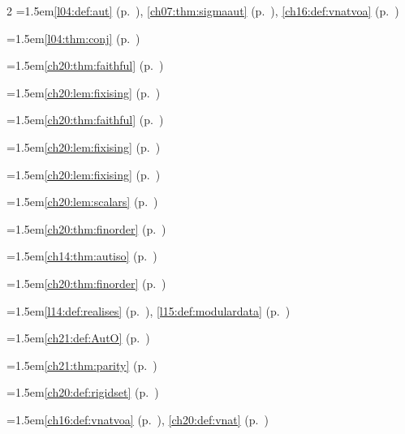 \begin{multicols}{2}
\hangindent=1.5em\quad \ref{l04:def:aut} (p.~\pageref{l04:def:aut}), \ref{ch07:thm:sigmaaut} (p.~\pageref{ch07:thm:sigmaaut}), \ref{ch16:def:vnatvoa} (p.~\pageref{ch16:def:vnatvoa})\par
\hangindent=1.5em\quad \ref{l04:thm:conj} (p.~\pageref{l04:thm:conj})\par
\hangindent=1.5em\quad \ref{ch20:thm:faithful} (p.~\pageref{ch20:thm:faithful})\par
\hangindent=1.5em\quad \ref{ch20:lem:fixising} (p.~\pageref{ch20:lem:fixising})\par
\hangindent=1.5em\quad \ref{ch20:thm:faithful} (p.~\pageref{ch20:thm:faithful})\par
\hangindent=1.5em\quad \ref{ch20:lem:fixising} (p.~\pageref{ch20:lem:fixising})\par
\hangindent=1.5em\quad \ref{ch20:lem:fixising} (p.~\pageref{ch20:lem:fixising})\par
\hangindent=1.5em\quad \ref{ch20:lem:scalars} (p.~\pageref{ch20:lem:scalars})\par
\hangindent=1.5em\quad \ref{ch20:thm:finorder} (p.~\pageref{ch20:thm:finorder})\par
\hangindent=1.5em\quad \ref{ch14:thm:autiso} (p.~\pageref{ch14:thm:autiso})\par
\hangindent=1.5em\quad \ref{ch20:thm:finorder} (p.~\pageref{ch20:thm:finorder})\par
\hangindent=1.5em\quad \ref{l14:def:realises} (p.~\pageref{l14:def:realises}), \ref{l15:def:modulardata} (p.~\pageref{l15:def:modulardata})\par
\hangindent=1.5em\quad \ref{ch21:def:AutO} (p.~\pageref{ch21:def:AutO})\par
\hangindent=1.5em\quad \ref{ch21:thm:parity} (p.~\pageref{ch21:thm:parity})\par
\hangindent=1.5em\quad \ref{ch20:def:rigidset} (p.~\pageref{ch20:def:rigidset})\par
\hangindent=1.5em\quad \ref{ch16:def:vnatvoa} (p.~\pageref{ch16:def:vnatvoa}), \ref{ch20:def:vnat} (p.~\pageref{ch20:def:vnat})\par

\end{multicols}
